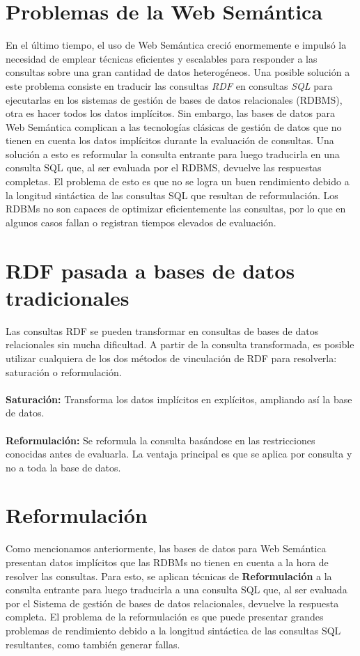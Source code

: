 \documentclass[10pt,a4paper]{article}
\begin{document}
\section{Problemas de la Web Semántica}
En el último tiempo, el uso de Web Semántica creció enormemente e impulsó la necesidad de emplear técnicas eficientes y escalables para responder a las consultas sobre una gran cantidad de datos heterogéneos. Una posible solución a este problema consiste en traducir las consultas \textit{RDF} en consultas \textit{SQL} para ejecutarlas en los sistemas de gestión de bases de datos relacionales (RDBMS), otra es hacer todos los datos implícitos. Sin embargo, las bases de datos para Web Semántica complican a las tecnologías clásicas de gestión de datos que no tienen en cuenta los datos implícitos durante la evaluación de consultas. Una solución a esto es reformular la consulta entrante para luego traducirla en una consulta SQL que, al ser evaluada por el RDBMS, devuelve las respuestas completas. El problema de esto es que no se logra un buen rendimiento debido a la longitud sintáctica de las consultas SQL que resultan de reformulación. Los RDBMs no son capaces de optimizar eficientemente las consultas, por lo que en algunos casos fallan o registran tiempos elevados de evaluación.

\section{RDF pasada a bases de datos tradicionales}
Las consultas RDF se pueden transformar en consultas de bases de datos relacionales sin mucha dificultad. A partir de la consulta transformada, es posible utilizar cualquiera de los dos métodos de vinculación de RDF para resolverla: saturación o reformulación.
\\\\
\textbf{Saturación:} Transforma los datos implícitos en explícitos, ampliando así la base de datos. 
\\\\
\textbf{Reformulación:} Se reformula la consulta basándose en las restricciones conocidas antes de evaluarla. La ventaja principal es que se aplica por consulta y no a toda la base de datos.

\section{Reformulación}

Como mencionamos anteriormente, las bases de datos para Web Semántica presentan datos implícitos que las RDBMs no tienen en cuenta a la hora de resolver las consultas. Para esto, se aplican técnicas de \textbf{Reformulación} a la consulta entrante para luego traducirla a una consulta SQL que, al ser evaluada por el Sistema de gestión de bases de datos relacionales, devuelve la respuesta completa. El problema de la reformulación es que puede presentar grandes problemas de rendimiento debido a la longitud sintáctica de las consultas SQL resultantes, como también generar fallas.
\end{document}
